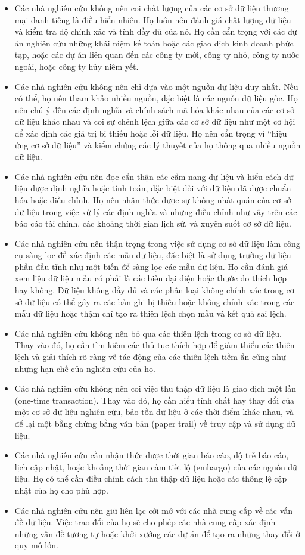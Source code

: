 \begin{itemize}
  \item Các nhà nghiên cứu không nên coi chất lượng của các cơ sở dữ liệu thương mại danh tiếng là điều hiển nhiên. Họ luôn nên đánh giá chất lượng dữ liệu và kiểm tra độ chính xác và tính đầy đủ của nó. Họ cần cẩn trọng với các dự án nghiên cứu những khái niệm kế toán hoặc các giao dịch kinh doanh phức tạp, hoặc các dự án liên quan đến các công ty mới, công ty nhỏ, công ty nước ngoài, hoặc công ty hủy niêm yết.
  \item Các nhà nghiên cứu không nên chỉ dựa vào một nguồn dữ liệu duy nhất. Nếu có thể, họ nên tham khảo nhiều nguồn, đặc biệt là các nguồn dữ liệu gốc. Họ nên chú ý đến các định nghĩa và chính sách mã hóa khác nhau của các cơ sở dữ liệu khác nhau và coi sự chênh lệch giữa các cơ sở dữ liệu như một cơ hội để xác định các giá trị bị thiếu hoặc lỗi dữ liệu. Họ nên cẩn trọng vì ``hiệu ứng cơ sở dữ liệu'' và kiểm chứng các lý thuyết của họ thông qua nhiều nguồn dữ liệu.
  \item Các nhà nghiên cứu nên đọc cẩn thận các cẩm nang dữ liệu và hiểu cách dữ liệu được định nghĩa hoặc tính toán, đặc biệt đối với dữ liệu đã được chuẩn hóa hoặc điều chỉnh. Họ nên nhận thức được sự không nhất quán của cơ sở dữ liệu trong việc xử lý các định nghĩa và những điều chỉnh như vậy trên các báo cáo tài chính, các khoảng thời gian lịch sử, và xuyên suốt cơ sở dữ liệu.
  \item Các nhà nghiên cứu nên thận trọng trong việc sử dụng cơ sở dữ liệu làm công cụ sàng lọc để xác định các mẫu dữ liệu, đặc biệt là sử dụng trường dữ liệu phần đầu tĩnh như một biến để sàng lọc các mẫu dữ liệu. Họ cần đánh giá xem liệu dữ liệu mẫu có phải là các biến đại diện hoặc thước đo thích hợp hay không. Dữ liệu không đầy đủ và các phân loại không chính xác trong cơ sở dữ liệu có thể gây ra các bản ghi bị thiếu hoặc không chính xác trong các mẫu dữ liệu hoặc thậm chí tạo ra thiên lệch chọn mẫu và kết quả sai lệch.
  \item Các nhà nghiên cứu không nên bỏ qua các thiên lệch trong cơ sở dữ liệu. Thay vào đó, họ cần tìm kiếm các thủ tục thích hợp để giảm thiểu các thiên lệch và giải thích rõ ràng về tác động của các thiên lệch tiềm ẩn cũng như những hạn chế của nghiên cứu của họ.
  \item Các nhà nghiên cứu không nên coi việc thu thập dữ liệu là giao dịch một lần (one-time transaction). Thay vào đó, họ cần hiểu tính chất hay thay đổi của một cơ sở dữ liệu nghiên cứu, bảo tồn dữ liệu ở các thời điểm khác nhau, và để lại một bằng chứng bằng văn bản (paper trail) về truy cập và sử dụng dữ liệu.
  \item Các nhà nghiên cứu cần nhận thức được thời gian báo cáo, độ trễ báo cáo, lịch cập nhật, hoặc khoảng thời gian cấm tiết lộ (embargo) của các nguồn dữ liệu. Họ có thể cần điều chỉnh cách thu thập dữ liệu hoặc các thông lệ cập nhật của họ cho phù hợp.
  \item Các nhà nghiên cứu nên giữ liên lạc cởi mở với các nhà cung cấp về các vấn đề dữ liệu. Việc trao đổi của họ sẽ cho phép các nhà cung cấp xác định những vấn đề tương tự hoặc khởi xướng các dự án để tạo ra những thay đổi ở quy mô lớn.
\end{itemize}
